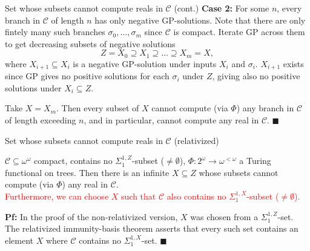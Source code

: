 \begin{frame}{Set whose subsets cannot compute reals in $\mathcal{C}$
(cont.)}
  \textbf{Case 2:} For some $n$, every branch in $\mathcal{C}$ of length
  $n$ has only negative GP-solutions. Note that there are only fintely many
  such branches $\sigma_0,\ldots,\sigma_m$ since $\mathcal{C}$ is compact.
  Iterate GP across them to get decreasing subsets of negative solutions
  \[Z=X_0 \supseteq X_1 \supseteq \ldots\supseteq X_m=X,\]
  where $X_{i+1}\subseteq X_i$ is a negative GP-solution under inputs
  $X_i$ and $\sigma_i$. $X_{i+1}$ exists since GP gives no positive
  solutions for each $\sigma_i$ under $Z$, giving also no positive
  solutions under $X_i\subseteq Z$.
  
  \vspace{1em}
  Take $X=X_m$. Then every subset of $X$ cannot compute (via $\Phi$) any
  branch in $\mathcal{C}$ of length exceeding $n$, and in particular,
  cannot compute any real in $\mathcal{C}$. $\blacksquare$
\end{frame}

\begin{frame}{Set whose subsets cannot compute reals in $\mathcal{C}$
(relativized)}
  \begin{main-lemma*}[\textcolor{red}{Relativized}]
    $\mathcal{C}\subseteq\omega^\omega$ compact, contains no
    $\Sigma_1^{1,Z}$-subset ($\neq\emptyset$),
    $\Phi:2^{\omega}\rightarrow \omega^{<\omega}$ a Turing functional on
    trees. Then there is an infinite $X\subseteq Z$ whose subsets cannot
    compute (via $\Phi$) any real in $\mathcal{C}$.\\
    \vspace{0.5em}
    \textcolor{red}{Furthermore, we can choose $X$ such that $\mathcal{C}$
    also contains no $\Sigma_1^{1,X}$-subset ($\neq\emptyset$).}
  \end{main-lemma*}

  \vspace{1em}
  \textbf{Pf:} In the proof of the non-relativized version, $X$ was chosen
  from a $\Sigma_1^{1,Z}$-set. The relativized immunity-basis theorem
  asserts that every such set contains an element $X$ where $\mathcal{C}$
  contains no $\Sigma_1^{1,X}$-set. $\blacksquare$
\end{frame}

